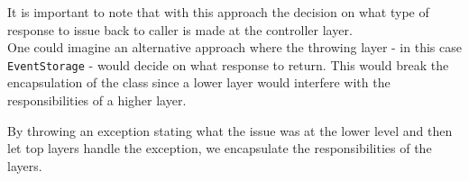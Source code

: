 It is important to note that with this approach the decision on what type of response to issue back to caller is made at the controller layer. \\

One could imagine an alternative approach where the throwing layer - in this case \texttt{EventStorage} - would decide on what response to return. This would break the encapsulation of the class since a lower layer would interfere with the responsibilities of a higher layer. 

By throwing an exception stating what the issue was at the lower level and then let top layers handle the exception, we encapsulate the responsibilities of the layers.